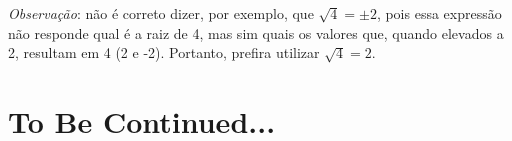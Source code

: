 \documentclass{article}
\begin{document}
\emph{Observação}: não é correto dizer, por exemplo, que $\sqrt{4} = \pm 2$, pois essa expressão não responde qual é a raiz de 4, mas sim quais os valores que, quando elevados a 2, resultam em 4 (2 e -2).  Portanto, prefira utilizar $\sqrt{4} = 2$.

\section{To Be Continued...}
\end{document}

